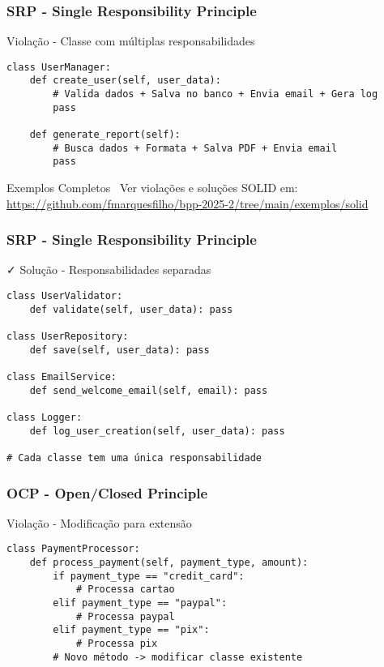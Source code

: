 \documentclass[aspectratio=169]{beamer}
\begin{document}
\begin{frame}[fragile]
\frametitle{SRP - Single Responsibility Principle}
\begin{block}{\textcolor{cleanred}{\faTimes} Violação - Classe com múltiplas responsabilidades}
\scriptsize
\begin{lstlisting}
class UserManager:
    def create_user(self, user_data):
        # Valida dados + Salva no banco + Envia email + Gera log
        pass
        
    def generate_report(self):
        # Busca dados + Formata + Salva PDF + Envia email
        pass
\end{lstlisting}
\end{block}

\vspace{0.3cm}
\begin{alertblock}{Exemplos Completos}
\footnotesize
\faGithub \, Ver violações e soluções SOLID em: \\
\url{https://github.com/fmarquesfilho/bpp-2025-2/tree/main/exemplos/solid}
\end{alertblock}
\end{frame}

\begin{frame}[fragile]
\frametitle{SRP - Single Responsibility Principle}
\begin{block}{\textcolor{cleangreen}{\faCheck} Solução - Responsabilidades separadas}
\scriptsize
\begin{lstlisting}
class UserValidator:
    def validate(self, user_data): pass

class UserRepository:
    def save(self, user_data): pass

class EmailService:
    def send_welcome_email(self, email): pass

class Logger:
    def log_user_creation(self, user_data): pass

# Cada classe tem uma única responsabilidade
\end{lstlisting}
\end{block}
\end{frame}

\begin{frame}[fragile]
\frametitle{OCP - Open/Closed Principle}
\begin{block}{\textcolor{cleanred}{\faTimes} Violação - Modificação para extensão}
\scriptsize
\begin{lstlisting}
class PaymentProcessor:
    def process_payment(self, payment_type, amount):
        if payment_type == "credit_card":
            # Processa cartao
        elif payment_type == "paypal":
            # Processa paypal
        elif payment_type == "pix":
            # Processa pix
        # Novo método -> modificar classe existente
\end{lstlisting}
\end{block}
\end{frame}
\end{document}

